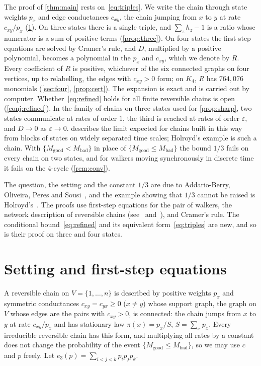 \documentclass[11pt,a4paper]{article}
\numberwithin{equation}{section}
\theoremstyle{remark}
\newcommand{\eps}{\varepsilon}
\newcommand{\good}{M_{\mathrm{good}}}
\newcommand{\bad}{M_{\mathrm{bad}}}
\begin{document}
The proof of \cref{thm:main} rests on~\eqref{eq:triples}. We write the chain through state weights $p_x$ and edge conductances $c_{xy}$, the chain jumping from $x$ to $y$ at rate $c_{xy}/p_x$ (\cref{sec:setup}). On three states there is a single triple, and $\sum_zh_z-1$ is a ratio whose numerator is a sum of positive terms (\cref{prop:three}). On four states the first-step equations are solved by Cramer's rule, and $D$, multiplied by a positive polynomial, becomes a polynomial in the $p_x$ and $c_{xy}$, which we denote by $R$. Every coefficient of $R$ is positive, whichever of the six connected graphs on four vertices, up to relabelling, the edges with $c_{xy}>0$ form; on $K_4$, $R$ has $764{,}076$ monomials (\cref{sec:four}, \cref{prop:cert}). The expansion is exact and is carried out by computer.
Whether~\eqref{eq:refined} holds for all finite reversible chains is open (\cref{conj:refined}). In the family of chains on three states used for \cref{prop:sharp}, two states communicate at rates of order $1$, the third is reached at rates of order $\eps$, and $D\to0$ as $\eps\to0$.  describes the limit expected for chains built in this way from blocks of states on widely separated time scales; Holroyd's example is such a chain. With $\{\good<\bad\}$ in place of $\{\good\le\bad\}$ the bound $1/3$ fails on every chain on two states, and for walkers moving synchronously in discrete time it fails on the $4$-cycle (\cref{rem:conv}).

The question, the setting and the constant $1/3$ are due to Addario-Berry, Oliveira, Peres and Sousi~\cite{ABOPS}, and the example showing that $1/3$ cannot be raised is Holroyd's~\cite[Section~6]{ABOPS}. The proofs use first-step equations for the pair of walkers, the network description of reversible chains (see~\cite[Chapter~9]{LP} and~\cite[Chapter~3]{AF}), and Cramer's rule. The conditional bound~\eqref{eq:refined} and its equivalent form~\eqref{eq:triples} are new, and so is their proof on three and four states.

\section{Setting and first-step equations}\label{sec:setup}

A reversible chain on $V=\{1,\dots,n\}$ is described by positive weights $p_x$ and symmetric conductances $c_{xy}=c_{yx}\ge0$ ($x\ne y$) whose support graph, the graph on $V$ whose edges are the pairs with $c_{xy}>0$, is connected: the chain jumps from $x$ to $y$ at rate $c_{xy}/p_x$ and has stationary law $\pi(x)=p_x/S$, $S=\sum_xp_x$. Every irreducible reversible chain has this form, and multiplying all rates by a constant does not change the probability of the event $\{\good\le\bad\}$, so we may use $c$ and $p$ freely. Let $e_3(p)=\sum_{i<j<k}p_ip_jp_k$.
\end{document}
